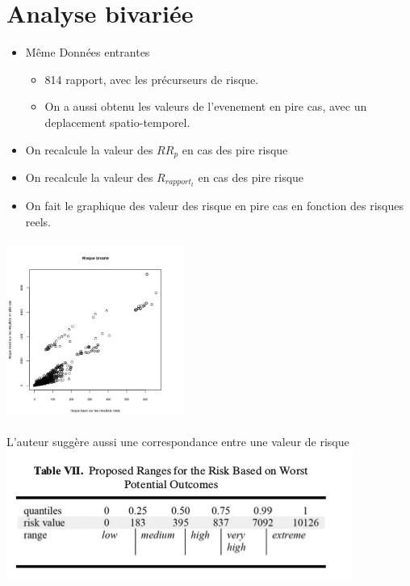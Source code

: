 \section{Analyse bivariée}

\begin{frame}
	\begin{itemize}
	\item Même Données entrantes
	
	\begin{itemize}
		\item 814 rapport, avec les précurseurs de risque. 
		\item On a aussi obtenu les valeurs de l'evenement en pire cas, avec un deplacement spatio-temporel.
	\end{itemize}	
	
	\item On recalcule la valeur des $RR_p$ en cas des pire risque
	\item On recalcule la valeur des $R_{rapport_t}$ en cas des pire risque
	\item On fait le graphique des valeur des risque en pire cas en fonction des risques reels.

	\end{itemize}

\end{frame}

\begin{frame}
	\includegraphics[width=220px, height=220px]{risque_bivarie}	
\end{frame}


\begin{frame}
	L'auteur suggère aussi une correspondance entre une valeur de risque 
	\includegraphics[width=\paperwidth]{range_propose_pire}	
\end{frame}


